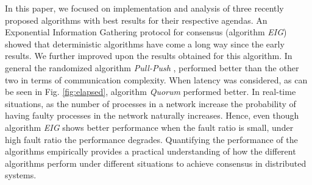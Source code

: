 In this paper, we focused on implementation and analysis of three recently proposed algorithms with best results for their respective agendas. An Exponential Information Gathering protocol for consensus \cite{KM13} (algorithm \textit{EIG}) showed that deterministic algorithms have come a long way since the early results. We further improved upon the results obtained for this algorithm. In general the randomized algorithm \textit{Pull-Push} \cite{BGH13}, performed better than the other two in terms of communication complexity. When latency was considered, as can be seen in Fig. \ref{fig:elapsed}, algorithm \textit{Quorum} \cite{BPV06} performed better. In real-time situations, as the number of processes in a network increase the probability of having faulty processes in the network naturally increases. Hence, even though algorithm \textit{EIG} shows better performance when the fault ratio is small, under high fault ratio the performance degrades. Quantifying the performance of the algorithms empirically provides a
practical understanding of how the different algorithms perform under
different situations to achieve consensus in distributed systems.
